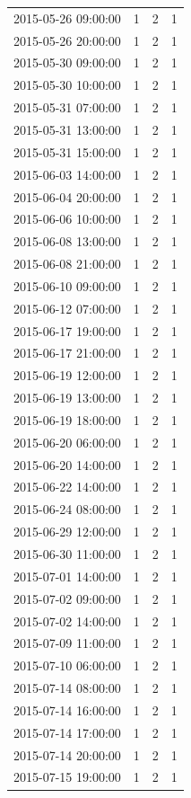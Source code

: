 \begin{tabular}{lrrr}
2015-05-26 09:00:00 & 1 & 2 & 1 \\
2015-05-26 20:00:00 & 1 & 2 & 1 \\
2015-05-30 09:00:00 & 1 & 2 & 1 \\
2015-05-30 10:00:00 & 1 & 2 & 1 \\
2015-05-31 07:00:00 & 1 & 2 & 1 \\
2015-05-31 13:00:00 & 1 & 2 & 1 \\
2015-05-31 15:00:00 & 1 & 2 & 1 \\
2015-06-03 14:00:00 & 1 & 2 & 1 \\
2015-06-04 20:00:00 & 1 & 2 & 1 \\
2015-06-06 10:00:00 & 1 & 2 & 1 \\
2015-06-08 13:00:00 & 1 & 2 & 1 \\
2015-06-08 21:00:00 & 1 & 2 & 1 \\
2015-06-10 09:00:00 & 1 & 2 & 1 \\
2015-06-12 07:00:00 & 1 & 2 & 1 \\
2015-06-17 19:00:00 & 1 & 2 & 1 \\
2015-06-17 21:00:00 & 1 & 2 & 1 \\
2015-06-19 12:00:00 & 1 & 2 & 1 \\
2015-06-19 13:00:00 & 1 & 2 & 1 \\
2015-06-19 18:00:00 & 1 & 2 & 1 \\
2015-06-20 06:00:00 & 1 & 2 & 1 \\
2015-06-20 14:00:00 & 1 & 2 & 1 \\
2015-06-22 14:00:00 & 1 & 2 & 1 \\
2015-06-24 08:00:00 & 1 & 2 & 1 \\
2015-06-29 12:00:00 & 1 & 2 & 1 \\
2015-06-30 11:00:00 & 1 & 2 & 1 \\
2015-07-01 14:00:00 & 1 & 2 & 1 \\
2015-07-02 09:00:00 & 1 & 2 & 1 \\
2015-07-02 14:00:00 & 1 & 2 & 1 \\
2015-07-09 11:00:00 & 1 & 2 & 1 \\
2015-07-10 06:00:00 & 1 & 2 & 1 \\
2015-07-14 08:00:00 & 1 & 2 & 1 \\
2015-07-14 16:00:00 & 1 & 2 & 1 \\
2015-07-14 17:00:00 & 1 & 2 & 1 \\
2015-07-14 20:00:00 & 1 & 2 & 1 \\
2015-07-15 19:00:00 & 1 & 2 & 1 \\

\end{tabular}
